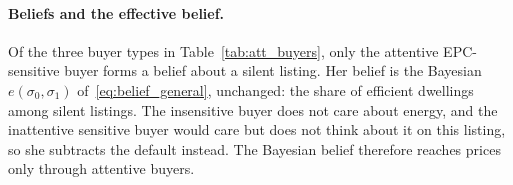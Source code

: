 \paragraph{Beliefs and the effective belief.}
Of the three buyer types in Table~\ref{tab:att_buyers}, only the attentive EPC-sensitive buyer forms a belief about a silent listing. Her belief is the Bayesian $e(\sigma_0,\sigma_1)$ of~\eqref{eq:belief_general}, unchanged: the share of efficient dwellings among silent listings. The insensitive buyer does not care about energy, and the inattentive sensitive buyer would care but does not think about it on this listing, so she subtracts the default instead. The Bayesian belief therefore reaches prices only through attentive buyers.

